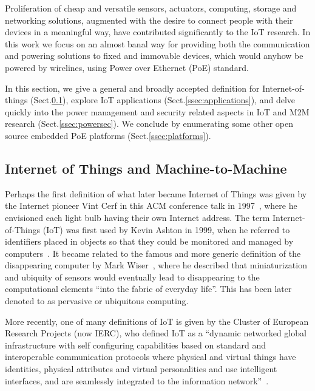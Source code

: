 \documentclass[final]{siamltex}
\begin{document}
Proliferation of cheap and versatile sensors, actuators, computing, storage and
networking solutions, augmented with the desire to connect people with their
devices in a meaningful way, have contributed significantly to the IoT research.
In this work we focus on an almost banal way for providing both the
communication and powering solutions to fixed and immovable devices, which would
anyhow be powered by wirelines, using Power over Ethernet (PoE) standard. 

In this section, we give a general and broadly accepted definition for
Internet-of-things (Sect.\ref{ssec:definition}), explore IoT
applications (Sect.\ref{ssec:applications}), and delve quickly into the
power management and security related aspects in IoT and M2M research
(Sect.\ref{ssec:powersec}). We conclude by enumerating some
other open source embedded PoE platforms (Sect.\ref{ssec:platforms}).


\subsection{Internet of Things and Machine-to-Machine}
\label{ssec:definition}

Perhaps the first definition of what later became Internet of Things
was given by the Internet pioneer Vint Cerf in this ACM conference
talk in 1997~\cite{cerf1997next}, where he envisioned each light bulb
having their own Internet address.
The term Internet-of-Things (IoT) was first used
by Kevin Ashton in 1999, when he referred to identifiers
placed in objects so that they could be monitored and managed by
computers~\cite{ashton2009internet}.  It
became related to the famous and more generic definition of the
disappearing computer by Mark Wiser~\cite{weiser1991computer}, where he
described that miniaturization and ubiquity of sensors would
eventually lead to disappearing to the computational elements ``into
the fabric of everyday life''.  This has been later denoted to as
pervasive or ubiquitous computing.

More recently, one of many definitions of IoT is given by the Cluster
of European Research
Projects (now IERC), who defined IoT as a ``dynamic networked global
infrastructure with self configuring capabilities based on standard
and interoperable communication protocols where physical and virtual
things have identities, physical attributes and virtual personalities
and use intelligent interfaces, and are seamlessly integrated to the
information network''~\cite{vermesan2011internet}.
\end{document}

